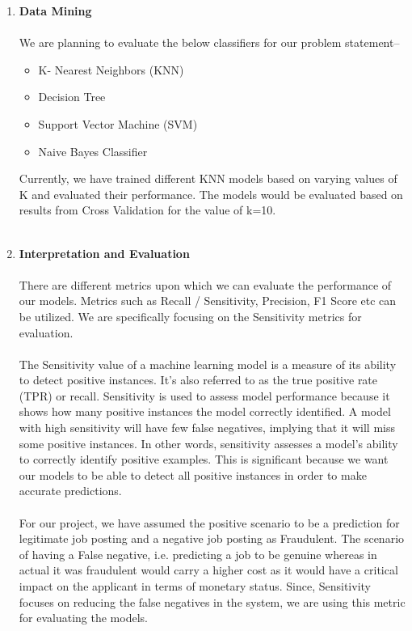 \documentclass{article}
\begin{document}
\begin{enumerate}[wide, labelwidth=!, labelindent=0pt]
\begin{enumerate}
            \item \textbf{Data Mining}\\\\
            We are planning to evaluate the below classifiers for our problem statement--
            \begin{itemize}
                \item K- Nearest Neighbors (KNN)
                \item Decision Tree
                \item Support Vector Machine (SVM)
                \item Naive Bayes Classifier
            \end{itemize}
            Currently, we have trained different KNN models based on varying values of K and evaluated their performance.
            The models would be evaluated based on results from Cross Validation for the value of k=10.\\\\

            \item \textbf{Interpretation and Evaluation}\\\\
            There are different metrics upon which we can evaluate the performance of our models. Metrics such as Recall / Sensitivity, Precision, F1 Score etc can be utilized. We are specifically focusing on the Sensitivity metrics for evaluation.\\\\
            The Sensitivity value of a machine learning model is a measure of its ability to detect positive instances. It's also referred to as the true positive rate (TPR) or recall. Sensitivity is used to assess model performance because it shows how many positive instances the model correctly identified. A model with high sensitivity will have few false negatives, implying that it will miss some positive instances. In other words, sensitivity assesses a model's ability to correctly identify positive examples. This is significant because we want our models to be able to detect all positive instances in order to make accurate predictions.\\\\
            For our project, we have assumed the positive scenario to be a prediction for legitimate job posting and a negative job posting as Fraudulent. The scenario of having a False negative, i.e. predicting a job to be genuine whereas in actual it was fraudulent would carry a higher cost as it would have a critical impact on the applicant in terms of monetary status. Since, Sensitivity focuses on reducing the false negatives in the system, we are using this metric for evaluating the models.\\\\
        \end{enumerate}


\end{enumerate}
\end{document}
